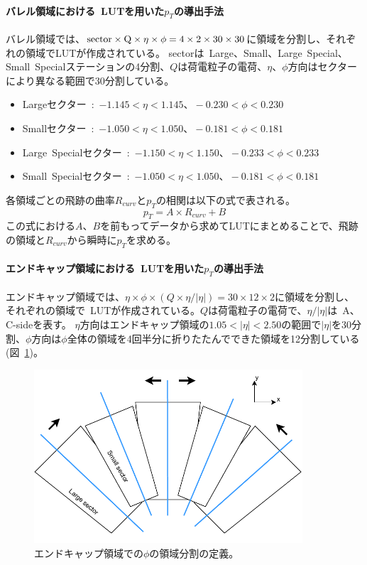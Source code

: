 \paragraph{バレル領域における~LUTを用いた$p_T$の導出手法}
バレル領域では、$\rm{sector}\times Q \times \eta \times \phi = 4\times2\times30\times30$に領域を分割し、それぞれの領域でLUTが作成されている。
sectorは~Large、Small、Large~Special、Small~Specialステーションの4分割、$Q$は荷電粒子の電荷、$\eta$、$\phi$方向はセクターにより異なる範囲で30分割している。
\begin{itemize}
    \item Largeセクター~:~$-1.145<\eta<1.145、-0.230<\phi<0.230$
    \item Smallセクター~:~$-1.050<\eta<1.050、-0.181<\phi<0.181$
    \item Large~Specialセクター~:~$-1.150<\eta<1.150、-0.233<\phi<0.233$
    \item Small~Specialセクター~:~$-1.050<\eta<1.050、-0.181<\phi<0.181$
\end{itemize}


各領域ごとの飛跡の曲率$R_{curv}$と$p_T$の相関は以下の式で表される。
\begin{equation}
    p_T=A \times R_{curv}+B
\end{equation}
この式における$A$、$B$を前もってデータから求めてLUTにまとめることで、飛跡の領域と$R_{curv}$から瞬時に$p_T$を求める。


\paragraph{エンドキャップ領域における~LUTを用いた$p_T$の導出手法}
エンドキャップ領域では、$\eta \times \phi \times (Q \times \eta/|\eta|)= 30\times12\times2$に領域を分割し、それぞれの領域で~LUTが作成されている。$Q$は荷電粒子の電荷で、$\eta/|\eta|$は~A、C-sideを表す。
$\eta$方向はエンドキャップ領域の$1.05<|\eta|<2.50$の範囲で$|\eta|$を30分割、$\phi$方向は$\phi$全体の領域を4回半分に折りたたんでできた領域を12分割している(図~\ref{fig:3-10})。

\begin{figure}[h]
  \centering
  \includegraphics[clip, width=10cm]{fig/3/LUT_binning.pdf}
  \caption{エンドキャップ領域での$\phi$の領域分割の定義。}
  \label{fig:3-10}
\end{figure}

